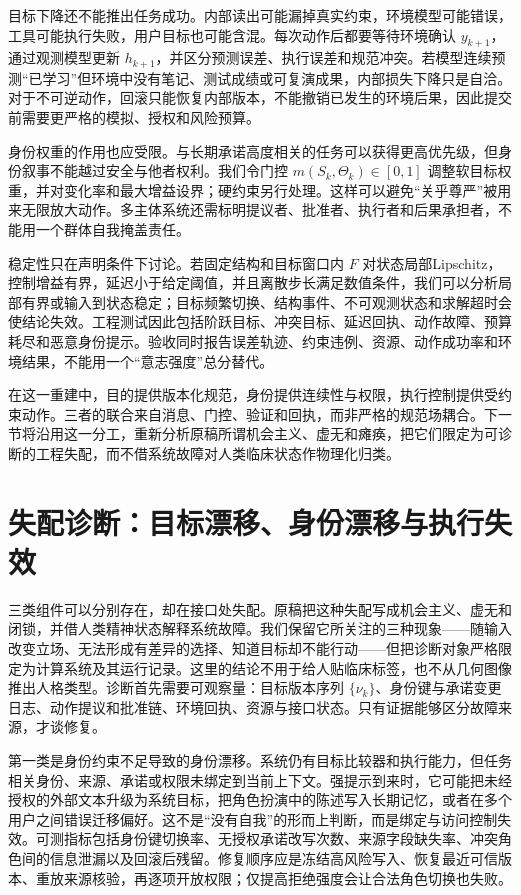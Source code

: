 目标下降还不能推出任务成功。内部读出可能漏掉真实约束，环境模型可能错误，工具可能执行失败，用户目标也可能含混。每次动作后都要等待环境确认 $y_{k+1}$，通过观测模型更新 $h_{k+1}$，并区分预测误差、执行误差和规范冲突。若模型连续预测“已学习”但环境中没有笔记、测试成绩或可复演成果，内部损失下降只是自洽。对于不可逆动作，回滚只能恢复内部版本，不能撤销已发生的环境后果，因此提交前需要更严格的模拟、授权和风险预算。

身份权重的作用也应受限。与长期承诺高度相关的任务可以获得更高优先级，但身份叙事不能越过安全与他者权利。我们令门控 $m(S_k,\Theta_k)\in[0,1]$ 调整软目标权重，并对变化率和最大增益设界；硬约束另行处理。这样可以避免“关乎尊严”被用来无限放大动作。多主体系统还需标明提议者、批准者、执行者和后果承担者，不能用一个群体自我掩盖责任。

稳定性只在声明条件下讨论。若固定结构和目标窗口内 $F$ 对状态局部Lipschitz，控制增益有界，延迟小于给定阈值，并且离散步长满足数值条件，我们可以分析局部有界或输入到状态稳定；目标频繁切换、结构事件、不可观测状态和求解超时会使结论失效。工程测试因此包括阶跃目标、冲突目标、延迟回执、动作故障、预算耗尽和恶意身份提示。验收同时报告误差轨迹、约束违例、资源、动作成功率和环境结果，不能用一个“意志强度”总分替代。

在这一重建中，目的提供版本化规范，身份提供连续性与权限，执行控制提供受约束动作。三者的联合来自消息、门控、验证和回执，而非严格的规范场耦合。下一节将沿用这一分工，重新分析原稿所谓机会主义、虚无和瘫痪，把它们限定为可诊断的工程失配，而不借系统故障对人类临床状态作物理化归类。

\section{失配诊断：目标漂移、身份漂移与执行失效}
\label{sec:section_5764}
三类组件可以分别存在，却在接口处失配。原稿把这种失配写成机会主义、虚无和闭锁，并借人类精神状态解释系统故障。我们保留它所关注的三种现象——随输入改变立场、无法形成有差异的选择、知道目标却不能行动——但把诊断对象严格限定为计算系统及其运行记录。这里的结论不用于给人贴临床标签，也不从几何图像推出人格类型。诊断首先需要可观察量：目标版本序列 $\{\nu_k\}$、身份键与承诺变更日志、动作提议和批准链、环境回执、资源与接口状态。只有证据能够区分故障来源，才谈修复。

第一类是身份约束不足导致的身份漂移。系统仍有目标比较器和执行能力，但任务相关身份、来源、承诺或权限未绑定到当前上下文。强提示到来时，它可能把未经授权的外部文本升级为系统目标，把角色扮演中的陈述写入长期记忆，或者在多个用户之间错误迁移偏好。这不是“没有自我”的形而上判断，而是绑定与访问控制失效。可测指标包括身份键切换率、无授权承诺改写次数、来源字段缺失率、冲突角色间的信息泄漏以及回滚后残留。修复顺序应是冻结高风险写入、恢复最近可信版本、重放来源核验，再逐项开放权限；仅提高拒绝强度会让合法角色切换也失败。

